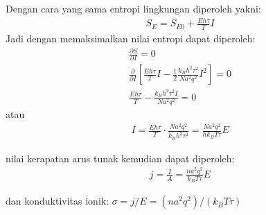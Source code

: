 \documentclass[t]{beamer}
\begin{document}
\begin{frame}
Dengan cara yang sama entropi lingkungan diperoleh yakni:
\begin{align}
S_E = S_{E0} +  \frac{Eh \tau }{T} I 
\end{align}
Jadi dengan memaksimalkan nilai entropi dapat diperoleh:
\begin{align}
\frac{\partial S}{\partial I} = 0  \nonumber \\
\frac{\partial }{\partial I} \left[ \frac{Eh \tau}{T} I - \frac{1}{2} \frac{k_B h^2 \tau^2  }{N a^2 q^2 } I^2 \right] = 0 \nonumber \\
 \frac{Eh\tau }{T} - \frac{k_B h^2 \tau^2 I}{N a^2 q^2}  = 0 \nonumber 
\end{align}
atau 
\begin{align}
 I = \frac{Eh \tau }{T} \cdot \frac{Na^2 q^2 }{k_B h^2 \tau^2 }  = \frac{N a^2 q^2 }{h k_B  T \tau } E
\end{align}


nilai kerapatan arus tunak  kemudian dapat diperoleh:
\begin{align}
j = \frac{I}{A} = \frac{na^2  q^2 }{k_B T \tau } E
\end{align}

dan konduktivitas ionik: $\boxed{\sigma = j/E = (n a^2 q^2)/ (k_B T \tau )}$
\end{frame}
\end{document}
